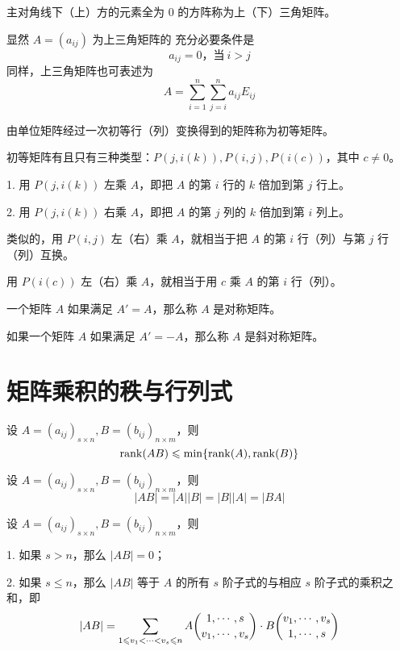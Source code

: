\begin{definition}
    主对角线下（上）方的元素全为 $0$ 的方阵称为上（下）三角矩阵。
\end{definition}

显然 $A=(a_{ij})$ 为上三角矩阵的 充分必要条件是
$$a_{ij}=0，\text{当}\ i>j$$
同样，上三角矩阵也可表述为
$$A = \sum_{i=1}^n\sum_{j=i}^na_{ij}E_{ij}$$

\begin{definition}
    由单位矩阵经过一次初等行（列）变换得到的矩阵称为初等矩阵。
\end{definition}

初等矩阵有且只有三种类型：$P(j,i(k)),P(i,j),P(i(c))$，其中 $c\ne 0$。

1. 用 $P(j,i(k))$ 左乘 $A$，即把 $A$ 的第 $i$ 行的 $k$ 倍加到第 $j$ 行上。

2. 用 $P(j,i(k))$ 右乘 $A$，即把 $A$ 的第 $j$ 列的 $k$ 倍加到第 $i$ 列上。

类似的，用 $P(i,j)$ 左（右）乘 $A$，就相当于把 $A$ 的第 $i$ 行（列）与第 $j$ 行（列）互换。

用 $P(i(c))$ 左（右）乘 $A$，就相当于用 $c$ 乘 $A$ 的第 $i$ 行（列）。

\begin{definition}
    一个矩阵 $A$ 如果满足 $A' = A$，那么称 $A$ 是对称矩阵。
\end{definition}

\begin{definition}
    如果一个矩阵 $A$ 如果满足 $A' = -A$，那么称 $A$ 是斜对称矩阵。
\end{definition}

\section{矩阵乘积的秩与行列式}

\begin{theorem}
    设 $A = (a_{ij})_{s\times n},B = (b_{ij})_{n\times m}$，则
    $$\operatorname{rank}(AB) \leqslant \min\{\operatorname{rank}(A),\operatorname{rank}(B)\}$$
\end{theorem}

\begin{theorem}
    设 $A = (a_{ij})_{s\times n},B = (b_{ij})_{n\times m}$，则
    $$|AB| = |A||B| = |B||A| = |BA|$$
\end{theorem}

\begin{theorem}
    设 $A = (a_{ij})_{s\times n},B = (b_{ij})_{n\times m}$，则

    1. 如果 $s>n$，那么 $|AB| = 0$；

    2. 如果 $s\leqslant n$，那么  $|AB|$ 等于 $A$ 的所有 $s$ 阶子式的与相应 $s$ 阶子式的乘积之和，即
    $$|AB|=\sum_{1\leqslant v_1<\cdots< v_s\leqslant n}A \dbinom{1,\cdots,s}{v_1,\cdots,v_s} \cdot B \dbinom{v_1,\cdots,v_s}{1,\cdots,s}$$
\end{theorem}

